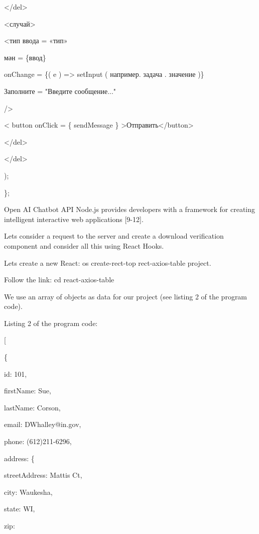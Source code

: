 \textless/del\textgreater{}

\textless случай\textgreater{}

\textless тип ввода = «тип»

мән = \{ввод\}

onChange = \{( e ) =\textgreater{} setInput ( например. задача .
значение )\}

Заполните = "Введите сообщение..."

/\textgreater{}

\textless{} button onClick = \{ sendMessage \}
\textgreater Отправить\textless/button\textgreater\hspace{0pt}

\textless/del\textgreater{}

\textless/del\textgreater{}

);

\};

Open AI Chatbot API Node.js provides developers with a framework for
creating intelligent interactive web applications {[}9-12{]}.

Let\textquotesingle s consider a request to the server and create a
download verification component and consider all this using React Hooks.

Let\textquotesingle s create a new React: os create-rect-top
rect-axios-table project.

Follow the link: cd react-axios-table

We use an array of objects as data for our project (see listing 2 of the
program code).

Listing 2 of the program code:

{[}

\{

id: 101,

firstName: \textquotesingle Sue\textquotesingle,

lastName: \textquotesingle Corson\textquotesingle,

email: \textquotesingle DWhalley@in.gov\textquotesingle,

phone: \textquotesingle(612)211-6296\textquotesingle,

address: \{

streetAddress:  Mattis Ct\textquotesingle,

city: \textquotesingle Waukesha\textquotesingle,

state: \textquotesingle WI\textquotesingle,

zip: \textquotesingle{}

